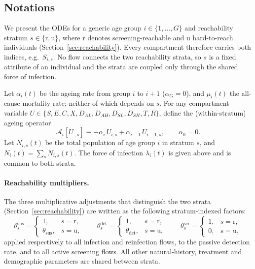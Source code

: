 \documentclass[11pt]{article}
\begin{document}
\subsection{Notations}
We present the ODEs for a generic age group \(i\in\{1,\dots,G\}\) and reachability stratum \(s\in\{\mathrm{r},\mathrm{u}\}\), where \(\mathrm{r}\) denotes screening-reachable and \(\mathrm{u}\) hard-to-reach individuals (Section~\ref{sec:reachability}). Every compartment therefore carries both indices, e.g.\ \(S_{i,s}\). No flow connects the two reachability strata, so \(s\) is a fixed attribute of an individual and the strata are coupled only through the shared force of infection.

Let \(\alpha_i(t)\) be the ageing rate from group \(i\) to \(i{+}1\) (\(\alpha_G=0\)), and \(\mu_i(t)\) the all-cause mortality rate; neither of which depends on \(s\). For any compartment variable \(U\in\{S,E,C,X,D_{AL},D_{AH},D_{SL},D_{SH},T,R\}\), define the (within-stratum) ageing operator
\[
\mathcal{A}_i[U_{\cdot,s}] \equiv -\alpha_i\, U_{i,s} + \alpha_{i-1}\, U_{i-1,s},\qquad \alpha_0=0.
\]
Let \(N_{i,s}(t)\) be the total population of age group \(i\) in stratum \(s\), and \(N_i(t)=\sum_{s}N_{i,s}(t)\). The force of infection \(\lambda_i(t)\) is given above and is common to both strata.

\paragraph{Reachability multipliers.}
The three multiplicative adjustments that distinguish the two strata (Section~\ref{sec:reachability}) are written as the following stratum-indexed factors:
\[
\theta^{\mathrm{sus}}_s =
\begin{cases}
1, & s=\mathrm{r},\\
\theta_{\mathrm{sus}}, & s=\mathrm{u},
\end{cases}
\qquad
\theta^{\mathrm{det}}_s =
\begin{cases}
1, & s=\mathrm{r},\\
\theta_{\mathrm{det}}, & s=\mathrm{u},
\end{cases}
\qquad
\theta^{\mathrm{scr}}_s =
\begin{cases}
1, & s=\mathrm{r},\\
0, & s=\mathrm{u},
\end{cases}
\]
applied respectively to all infection and reinfection flows, to the passive detection rate, and to all active screening flows. All other natural-history, treatment and demographic parameters are shared between strata.
\end{document}

